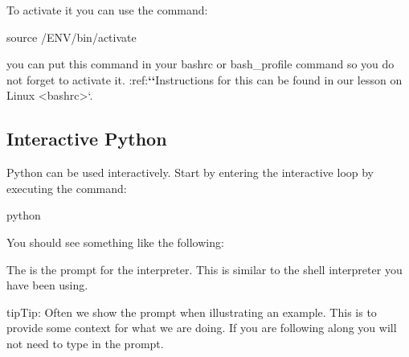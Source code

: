 To activate it you can use the command:

\begin{sphinxVerbatim}[commandchars=\\\{\}]
\PYGZdl{} source \PYGZti{}/ENV/bin/activate
\end{sphinxVerbatim}

you can put this command in your bashrc or bash\_profile command so you
do not forget to activate it. :ref:{\color{red}\bfseries{}{}`{}`}Instructions for this can be
found in our lesson on Linux \textless{}bashrc\textgreater{}{}`.


\subsection{Interactive Python}
\label{\detokenize{lesson/prg/python_intro:interactive-python}}
Python can be used interactively.  Start by entering the interactive
loop by executing the command:

\begin{sphinxVerbatim}[commandchars=\\\{\}]
\PYGZdl{} python
\end{sphinxVerbatim}

You should see something like the following:

\begin{sphinxVerbatim}[commandchars=\\\{\}]
      
\PYG{p}{[}  \PYG{p}{]}  
        
\end{sphinxVerbatim}

The \sphinxcode{\textgreater{}\textgreater{}\textgreater{}} is the prompt for the interpreter. This is similar to the
shell interpreter you have been using.

\begin{sphinxadmonition}{tip}{Tip:}
Often we show the prompt when illustrating an example. This is to
provide some context for what we are doing. If you are following
along you will not need to type in the prompt.
\end{sphinxadmonition}

